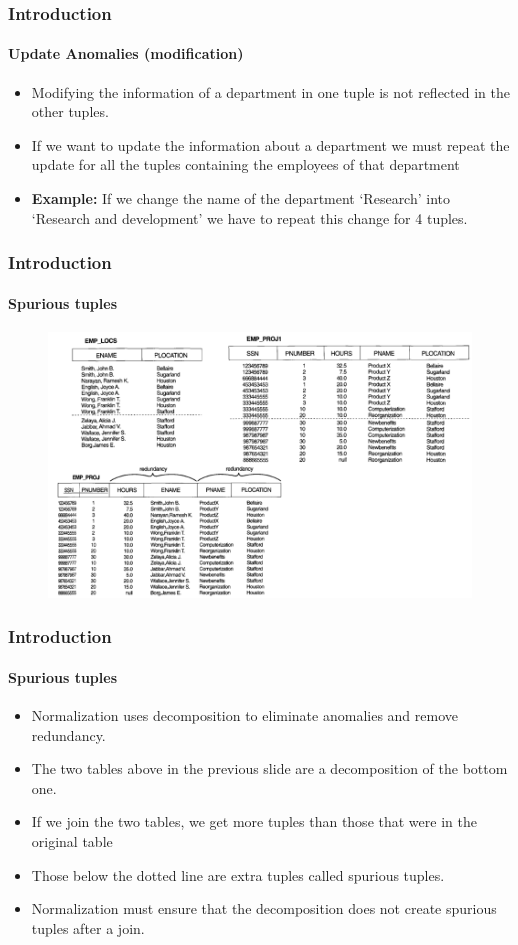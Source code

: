 \documentclass{beamer}
\begin{document}
\begin{frame}
	\frametitle{Introduction}
	\framesubtitle{Update Anomalies (modification)}
	
	\begin{itemize}
		\item Modifying the information of a department in one tuple is not reflected in the other tuples.
		\pause
		\item If we want to update the information about a department we must repeat the update for all the tuples containing the employees of that department	
		\pause
		\item \textbf{Example:}  If we change the name of the department ‘Research’ into ‘Research and development’ we have to repeat this change for 4 tuples.			
	\end{itemize}
\end{frame}

\begin{frame}
	\frametitle{Introduction}
	\framesubtitle{Spurious tuples}
	
	\begin{figure}
		\includegraphics[scale=0.4]{img/normalization/norm3}
	\end{figure}
\end{frame}

\begin{frame}
	\frametitle{Introduction}
	\framesubtitle{Spurious tuples}
	
	\begin{itemize}
		\item Normalization uses decomposition to eliminate anomalies and remove redundancy.
		\item The two tables above in the previous slide are a decomposition of the bottom one.
		\pause
		\item If we join the two tables, we get more tuples than those that were in the original table
		\pause
		\item Those below the dotted line are extra tuples called spurious tuples.
		\item Normalization must ensure that the decomposition does not create spurious tuples after a join.
	\end{itemize}
\end{frame}
\end{document}
